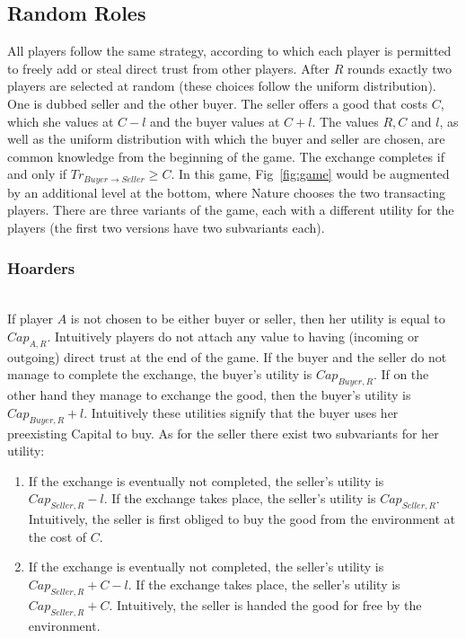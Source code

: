\subsection{Random Roles}
  All players follow the same strategy, according to which each player is permitted to freely add or steal direct trust from
  other players. After $R$ rounds exactly two players are selected at random (these choices follow the uniform distribution).
  One is dubbed seller and the other buyer. The seller offers a good that costs $C$, which she values at $C - l$ and the buyer
  values at $C + l$. The values $R, C$ and $l$, as well as the uniform distribution with which the buyer and seller are
  chosen, are common knowledge from the beginning of the game. The exchange completes if and only if $Tr_{Buyer \rightarrow
  Seller} \geq C$. In this game, Fig~\ref{fig:game} would be augmented by an additional level at the bottom, where Nature
  chooses the two transacting players. There are three variants of the game, each with a different utility for the players
  (the first two versions have two subvariants each).

  \subsubsection{Hoarders} \ \\

    If player $A$ is not chosen to be either buyer or seller, then her utility is equal to $Cap_{A, R}$. Intuitively players
    do not attach any value to having (incoming or outgoing) direct trust at the end of the game. If the buyer and the seller
    do not manage to complete the exchange, the buyer's utility is $Cap_{Buyer, R}$. If on the other hand they manage to
    exchange the good, then the buyer's utility is $Cap_{Buyer, R} + l$. Intuitively these utilities signify that the buyer
    uses her preexisting Capital to buy. As for the seller there exist two subvariants for her utility:
    \begin{enumerate}
      \item If the exchange is eventually not completed, the seller's utility is $Cap_{Seller, R} - l$. If the exchange takes
      place, the seller's utility is $Cap_{Seller, R}$. Intuitively, the seller is first obliged to buy the good from the
      environment at the cost of $C$.

      \item If the exchange is eventually not completed, the seller's utility is $Cap_{Seller, R} + C - l$. If the exchange
      takes place, the seller's utility is $Cap_{Seller, R} + C$. Intuitively, the seller is handed the good for free by the
      environment.
    \end{enumerate}
    
